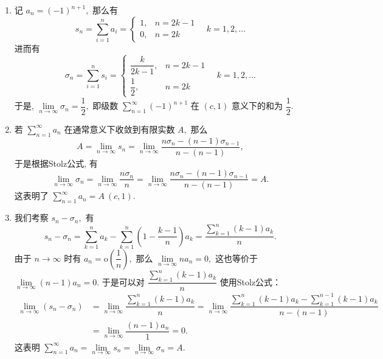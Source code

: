\begin{solution}
\begin{enumerate}
\item 记 $a_n = (-1)^{n+1},$ 那么有
$$s_n = \sum\limits_{i=1}^n a_i = \begin{cases}
1, & n = 2k - 1\\
0, & n = 2k
\end{cases} \quad k = 1, 2, \dots$$
进而有
$$\sigma_n = \sum\limits_{i=1}^n s_i = \begin{cases}
\dfrac{k}{2k - 1}, & n = 2k - 1\\
\dfrac{1}{2}, & n = 2k
\end{cases} \quad k = 1, 2, \dots$$
于是, $\lim\limits_{n \to \infty} \sigma_n = \dfrac{1}{2},$ 即级数 $\sum\limits_{n=1}^{\infty} (-1)^{n+1}$ 在 $(c, 1)$ 意义下的和为 $\dfrac{1}{2}.$
\item 若 $\sum\limits_{n=1}^{\infty} a_n$ 在通常意义下收敛到有限实数 $A,$ 那么
$$A = \lim\limits_{n \to \infty} s_n = \lim\limits_{n \to \infty} \dfrac{n\sigma_n - (n-1)\sigma_{n-1}}{n - (n-1)}, $$
于是根据Stolz公式, 有
$$\lim\limits_{n \to \infty} \sigma_n = \lim\limits_{n \to \infty} \dfrac{n\sigma_n}{n} = \lim\limits_{n \to \infty} \dfrac{n\sigma_n - (n-1)\sigma_{n-1}}{n - (n-1)} = A.$$
这表明了 $\sum\limits_{n=1}^{\infty} a_n = A~(c, 1).$
\item 我们考察 $s_n - \sigma_n,$ 有
$$s_n - \sigma_n = \sum\limits_{k=1}^n a_k - \sum\limits_{k=1}^n \left( 1 - \dfrac{k-1}{n} \right) a_k = \dfrac{\sum\limits_{k=1}^n (k-1)a_k}{n}.$$
由于 $n \to \infty$ 时有 $a_n = \mathrm{o}\left( \dfrac{1}{n} \right),$ 那么 $\lim\limits_{n \to \infty} n a_n = 0,$ 这也等价于 $\lim\limits_{n \to \infty} (n - 1) a_n = 0.$ 于是可以对 $\dfrac{\sum\limits_{k=1}^n (k-1)a_k}{n}$ 使用Stolz公式：
\begin{align*}
\lim\limits_{n \to \infty} (s_n - \sigma_n) & = \lim\limits_{n \to \infty} \dfrac{\sum\limits_{k=1}^n (k-1)a_k}{n} = \lim\limits_{n \to \infty} \dfrac{\sum\limits_{k=1}^n (k-1)a_k - \sum\limits_{k=1}^{n-1} (k-1)a_k}{n - (n-1)} \\
& = \lim\limits_{n \to \infty} \dfrac{(n-1)a_n}{1} = 0.
\end{align*}
这表明 $\sum\limits_{n=1}^{\infty} a_n = \lim\limits_{n \to \infty} s_n = \lim\limits_{n \to \infty} \sigma_n = A.$
\end{enumerate}
\end{solution}


